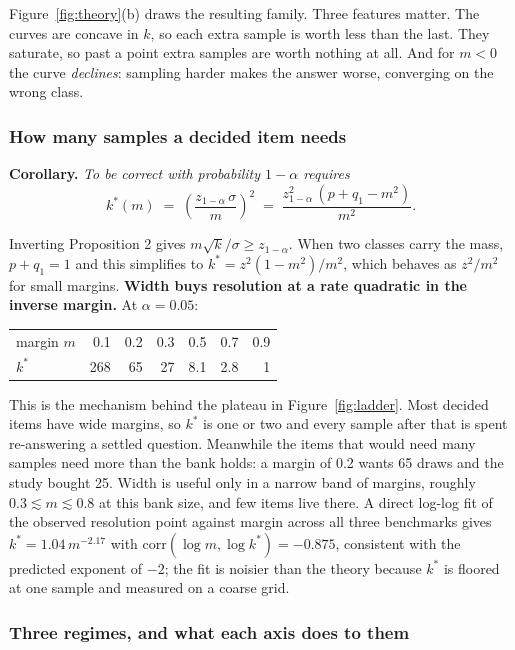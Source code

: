 \documentclass[11pt]{article}
\begin{document}
Figure~\ref{fig:theory}(b) draws the resulting family. Three features matter. The curves are
concave in $k$, so each extra sample is worth less than the last. They saturate, so past a point
extra samples are worth nothing at all. And for $m < 0$ the curve \emph{declines}: sampling harder
makes the answer worse, converging on the wrong class.

\subsubsection*{How many samples a decided item needs}

\textbf{Corollary.} \emph{To be correct with probability $1-\alpha$ requires}
\[
k^{*}(m) \;=\; \left(\frac{z_{1-\alpha}\,\sigma}{m}\right)^{2}
\;=\; \frac{z_{1-\alpha}^{2}\,(p + q_1 - m^{2})}{m^{2}}.
\]

Inverting Proposition 2 gives $m\sqrt{k}/\sigma \geq z_{1-\alpha}$. When two classes carry the mass,
$p + q_1 = 1$ and this simplifies to $k^* = z^2(1-m^2)/m^2$, which behaves as $z^2/m^2$ for small
margins. \textbf{Width buys resolution at a rate quadratic in the inverse margin.} At $\alpha = 0.05$:

\begin{center}
\small
\begin{tabular}{lrrrrrr}
\toprule
margin $m$ & 0.1 & 0.2 & 0.3 & 0.5 & 0.7 & 0.9 \\
$k^{*}$    & 268 & 65  & 27  & 8.1 & 2.8 & 1 \\
\bottomrule
\end{tabular}
\end{center}

This is the mechanism behind the plateau in Figure~\ref{fig:ladder}. Most decided items have wide
margins, so $k^*$ is one or two and every sample after that is spent re-answering a settled
question. Meanwhile the items that would need many samples need more than the bank holds: a margin
of 0.2 wants 65 draws and the study bought 25. Width is useful only in a narrow band of margins,
roughly $0.3 \lesssim m \lesssim 0.8$ at this bank size, and few items live there. A direct
log-log fit of the observed resolution point against margin across all three benchmarks gives
$k^{*} = 1.04\,m^{-2.17}$ with $\mathrm{corr}(\log m, \log k^{*}) = -0.875$, consistent with the
predicted exponent of $-2$; the fit is noisier than the theory because $k^*$ is floored at one
sample and measured on a coarse grid.

\subsubsection*{Three regimes, and what each axis does to them}
\end{document}
